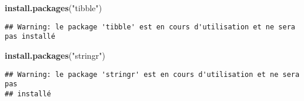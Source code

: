 \documentclass[
]{article}
\newenvironment{Shaded}{\begin{snugshade}}{\end{snugshade}}
\newcommand{\FunctionTok}[1]{\textcolor[rgb]{0.13,0.29,0.53}{\textbf{#1}}}
\newcommand{\NormalTok}[1]{#1}
\newcommand{\StringTok}[1]{\textcolor[rgb]{0.31,0.60,0.02}{#1}}
\begin{document}
\begin{Shaded}
\begin{Highlighting}[]
\FunctionTok{install.packages}\NormalTok{(}\StringTok{"tibble"}\NormalTok{)}
\end{Highlighting}
\end{Shaded}

\begin{verbatim}
## Warning: le package 'tibble' est en cours d'utilisation et ne sera pas installé
\end{verbatim}

\begin{Shaded}
\begin{Highlighting}[]
\FunctionTok{install.packages}\NormalTok{(}\StringTok{"stringr"}\NormalTok{)}
\end{Highlighting}
\end{Shaded}

\begin{verbatim}
## Warning: le package 'stringr' est en cours d'utilisation et ne sera pas
## installé
\end{verbatim}
\end{document}
